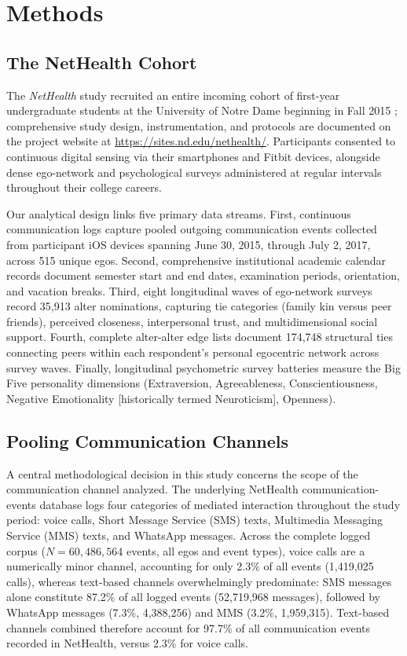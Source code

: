 \documentclass[11pt,letterpaper]{article}
\begin{document}
\section{Methods}

\subsection{The NetHealth Cohort}
The \textit{NetHealth} study recruited an entire incoming cohort of first-year undergraduate students at the University of Notre Dame beginning in Fall 2015 \citep{liu2018network,purta2016experiences,faust2017exploring}; comprehensive study design, instrumentation, and protocols are documented on the project website at \url{https://sites.nd.edu/nethealth/}. Participants consented to continuous digital sensing via their smartphones and Fitbit devices, alongside dense ego-network and psychological surveys administered at regular intervals throughout their college careers. 

Our analytical design links five primary data streams. First, continuous communication logs capture pooled outgoing communication events collected from participant iOS devices spanning June 30, 2015, through July 2, 2017, across 515 unique egos. Second, comprehensive institutional academic calendar records document semester start and end dates, examination periods, orientation, and vacation breaks. Third, eight longitudinal waves of ego-network surveys record 35,913 alter nominations, capturing tie categories (family kin versus peer friends), perceived closeness, interpersonal trust, and multidimensional social support. Fourth, complete alter-alter edge lists document 174,748 structural ties connecting peers within each respondent's personal egocentric network across survey waves. Finally, longitudinal psychometric survey batteries measure the Big Five personality dimensions (Extraversion, Agreeableness, Conscientiousness, Negative Emotionality [historically termed Neuroticism], Openness).

\subsection{Pooling Communication Channels}
A central methodological decision in this study concerns the scope of the communication channel analyzed. The underlying NetHealth communication-events database logs four categories of mediated interaction throughout the study period: voice calls, Short Message Service (SMS) texts, Multimedia Messaging Service (MMS) texts, and WhatsApp messages. Across the complete logged corpus ($N = 60,486,564$ events, all egos and event types), voice calls are a numerically minor channel, accounting for only 2.3\% of all events (1,419,025 calls), whereas text-based channels overwhelmingly predominate: SMS messages alone constitute 87.2\% of all logged events (52,719,968 messages), followed by WhatsApp messages (7.3\%, 4,388,256) and MMS (3.2\%, 1,959,315). Text-based channels combined therefore account for 97.7\% of all communication events recorded in NetHealth, versus 2.3\% for voice calls.
\end{document}
